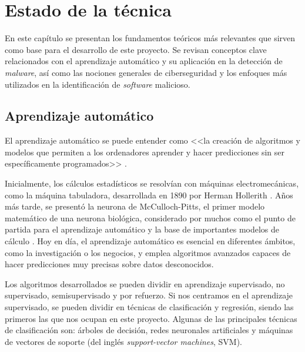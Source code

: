 \chapter{Estado de la técnica}
\label{ch:estado_tecnica}

En este capítulo se presentan los fundamentos teóricos más relevantes que sirven como base para el desarrollo de este proyecto. Se revisan conceptos clave relacionados con el aprendizaje automático y su aplicación en la detección de \textit{malware}, así como las nociones generales de ciberseguridad y los enfoques más utilizados en la identificación de \textit{software} malicioso.

\section{Aprendizaje automático}
\label{sec:aprend_auto}

El aprendizaje automático se puede entender como <<la creación de algoritmos y modelos que permiten a los ordenadores aprender y hacer predicciones sin ser específicamente programados>> \cite{mwclass}.

\vspace{1em}

Inicialmente, los cálculos estadísticos se resolvían con máquinas electromecánicas, como la máquina tabuladora, desarrollada en 1890 por Herman Hollerith \cite{maquina_tabuladora}. Años más tarde, se presentó la neurona de McCulloch-Pitts, el primer modelo matemático de una neurona biológica, considerado por muchos como el punto de partida para el aprendizaje automático y la base de importantes modelos de cálculo \cite{inproceedings}. Hoy en día, el aprendizaje automático es esencial en diferentes ámbitos, como la investigación o los negocios, y emplea algoritmos avanzados capaces de hacer predicciones muy precisas sobre datos desconocidos.

\vspace{1em}

Los algoritmos desarrollados se pueden dividir en aprendizaje supervisado, no supervisado, semisupervisado y por refuerzo. Si nos centramos en el aprendizaje supervisado, se pueden dividir en técnicas de clasificación y regresión, siendo las primeros las que nos ocupan en este proyecto. Algunas de las principales técnicas de clasificación son: árboles de decisión, redes neuronales artificiales y máquinas de vectores de soporte (del inglés \textit{support-vector machines}, SVM).

\vspace{1em}


